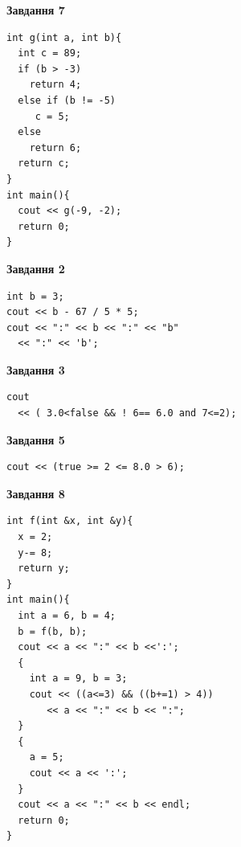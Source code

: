 \documentclass[12pt, ukrainian]{article}
\begin{document}
{\begin {large}
\begin{minipage}[t]{7.0cm}
\begin{center}
\textbf{Завдання 7}
\end{center}
\vspace{-8mm}

\begin{verbatim}
int g(int a, int b){
  int c = 89;
  if (b > -3)
    return 4;
  else if (b != -5)
     c = 5;
  else
    return 6;
  return c;
}
int main(){
  cout << g(-9, -2);
  return 0;
}
\end{verbatim}

\end{minipage}
\vline \hspace{1mm}
\begin{minipage}[t]{11.0cm}

\begin{center}
\textbf{Завдання 2}
\end{center}
\vspace{-8mm}

\begin{verbatim}
int b = 3;
cout << b - 67 / 5 * 5;
cout << ":" << b << ":" << "b" 
  << ":" << 'b';
\end{verbatim}



\begin{center}
\textbf{Завдання 3}
\end{center}
\vspace{-8mm}

\begin{verbatim}
cout 
  << ( 3.0<false && ! 6== 6.0 and 7<=2);
\end{verbatim}



\begin{center}
\textbf{Завдання 5}
\end{center}
\vspace{-8mm}

\begin{verbatim}
cout << (true >= 2 <= 8.0 > 6);
\end{verbatim}



\begin{center}
\textbf{Завдання 8}
\end{center}
\vspace{-8mm}

\begin{verbatim}
int f(int &x, int &y){
  x = 2;
  y-= 8;
  return y;
}
int main(){
  int a = 6, b = 4;
  b = f(b, b);
  cout << a << ":" << b <<':';
  {
    int a = 9, b = 3;
    cout << ((a<=3) && ((b+=1) > 4))
       << a << ":" << b << ":";
  }
  {
    a = 5;
    cout << a << ':';
  }
  cout << a << ":" << b << endl;
  return 0;
}
\end{verbatim}


\end{minipage}
\end{large}}
\end{document}
